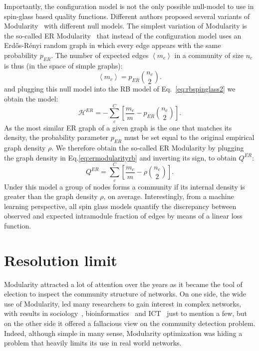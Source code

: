 Importantly, the configuration model is not the only possible null-model to use in spin-glass based quality functions. Different authors proposed several variants of Modularity~\cite{ronhovde2010,ronhovde2009,traag2011} with different null models.
The simplest variation of Modularity is the so-called ER Modularity~\cite{traag2015} that instead of the configuration model uses an Erd\H{o}s-Rényi random graph in which every edge appears with the same probability $p_{ER}$. The number of expected edges $\left< m_c \right>$ in a community of size $n_c$ is thus (in the space of simple graphs):
\begin{equation}
\left< m_c \right> = p_{ER}\binom{n_c}{2}.
\end{equation}
and plugging this null model into the RB model of Eq.~\ref{eq:rbspinglass2} we obtain the model:
\begin{equation}\label{eq:ermodularityrb}
\mathcal{H}^{ER} = -\sum \limits_c^C \left[\frac{m_c}{m}  - p_{ER}\binom{n_c}{2} \right].
\end{equation}
As the most similar ER graph of a given graph is the one that matches its density, the probability parameter $p_{ER}$ must be set equal to the original empirical graph density $\rho$. We therefore obtain the so-called ER Modularity by plugging the graph density in Eq.\ref{eq:ermodularityrb} and inverting its sign, to obtain $Q^{ER}$: 
\begin{equation}
Q^{ER} = \sum \limits_c^C \left[\frac{m_c}{m}  - \rho \binom{n_c}{2} \right].
\end{equation}
Under this model a group of nodes forms a community if its internal density is greater than the graph density $\rho$, on average.
Interestingly, from a machine learning perspective, all spin glass models quantify the discrepancy between observed and expected intramodule fraction of edges by means of a linear loss function.


\section{Resolution limit}\label{sec:resolutionlimit}
Modularity attracted a lot of attention over the years as it  became the tool of election to inspect the community structure of networks.
On one side, the wide use of Modularity, led many researchers to gain interest in complex networks, with results in sociology~\cite{li2008tag}, bioinformatics~\cite{saracc2012topology} and ICT~\cite{java2007we,leskovec2007dynamics} just to mention a few, but on the other side it offered a fallacious view on the community detection problem. 
Indeed, although simple in many sense, Modularity optimization was hiding a problem that heavily limits its use in real world networks.


